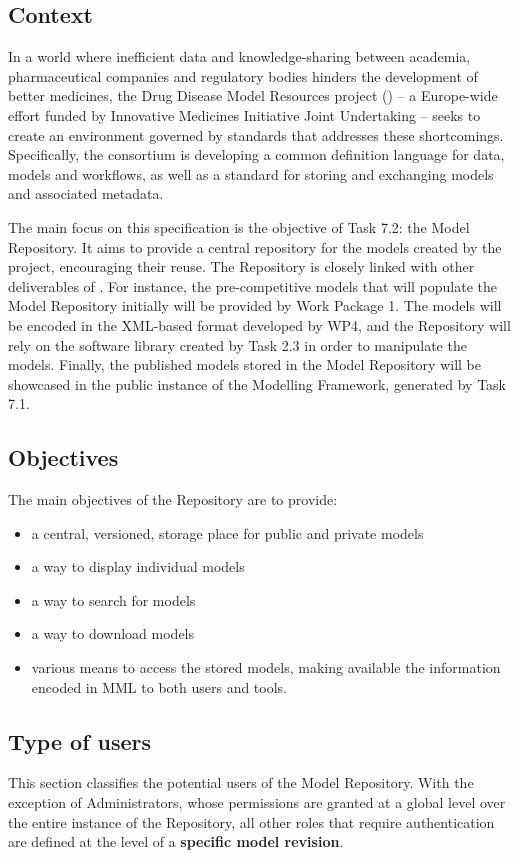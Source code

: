 \subsection{Context}
\label{context}
In a world where inefficient data and knowledge-sharing between academia, pharmaceutical companies and regulatory bodies hinders the development of better medicines, the Drug Disease Model Resources project (\ddmore) -- a Europe-wide effort funded by Innovative Medicines Initiative Joint Undertaking -- seeks to create an environment governed by standards that addresses these shortcomings. Specifically, the \ddmore consortium is developing a common definition language for data, models and workflows, as well as a standard for storing and exchanging \glspl{model} and associated \gls{metadata}\cite{ddmore:dow}.

The main focus on this specification is the objective of Task 7.2: the \ddmore Model Repository. It aims to provide a central repository for the models created by the project, encouraging their reuse. The Repository is closely linked with other deliverables of \ddmore. For instance, the pre-competitive models that will populate the Model Repository initially will be provided by Work Package 1. The models will be encoded in the XML-based format developed by WP4, and the Repository will rely on the software library created by Task 2.3 in order to manipulate the models. Finally, the published models stored in the \ddmore Model Repository will be showcased in the public instance of the Modelling Framework, generated by Task 7.1.

\subsection{Objectives}
\label{objectives}
The main objectives of the Repository are to provide:
\begin{itemize}
  \item a central, versioned, storage place for public and private models
  \item a way to display individual models
  \item a way to search for models
  \item a way to download models
  \item various means to access the stored \glspl{model}, making available the information encoded in MML to both users and tools. 
\end{itemize}

\subsection{Type of users}
\label{users}
This section classifies the potential users of the \ddmore Model Repository. With the exception of Administrators, whose permissions are granted at a global level over the entire instance of the Repository, all other roles that require authentication are defined at the level of a \textbf{specific model revision}.

